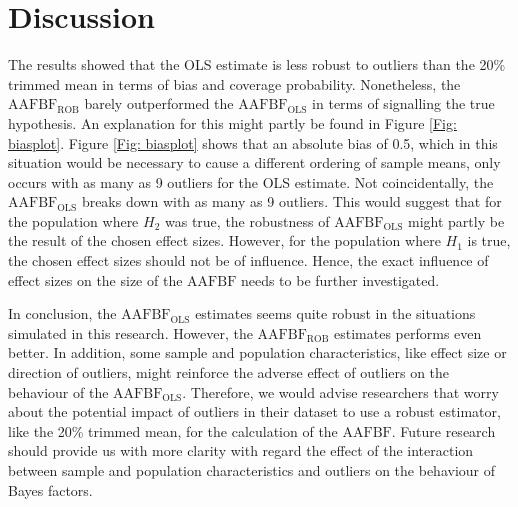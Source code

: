 \documentclass[11pt, a4paper]{article}
\begin{document}
\section{Discussion}
\label{section: Discussion}
The results showed that the OLS estimate is less robust to outliers than the 20\% trimmed mean in terms of bias and coverage probability. 
Nonetheless, the $\mathrm{AAFBF_{ROB}}$ barely outperformed the $\mathrm{AAFBF_{OLS}}$ in terms of signalling the true hypothesis. 
An explanation for this might partly be found in Figure \ref{Fig: biasplot}. 
Figure \ref{Fig: biasplot} shows that an absolute bias of 0.5, which in this situation would be necessary to cause a different ordering of sample means, only occurs with as many as 9 outliers for the OLS estimate. 
Not coincidentally, the $\mathrm{AAFBF_{OLS}}$ breaks down with as many as 9 outliers.  
This would suggest that for the population where $H_2$ was true, the robustness of  $\mathrm{AAFBF_{OLS}}$ might partly be the result of the chosen effect sizes. 
However, for the population where $H_1$ is true, the chosen effect sizes should not be of influence. 
Hence, the exact influence of effect sizes on the size of the $\mathrm{AAFBF}$ needs to be further investigated. 

In conclusion, the $\mathrm{AAFBF_{OLS}}$ estimates seems quite robust in the situations simulated in this research. 
However, the $\mathrm{AAFBF_{ROB}}$ estimates performs even better. In addition, some sample and population characteristics, like effect size or direction of outliers, might reinforce the adverse effect of outliers on the behaviour of the $\mathrm{AAFBF_{OLS}}$. 
Therefore, we would advise researchers that worry about the potential impact of outliers in their dataset to use a robust estimator, like the 20\% trimmed mean, for the calculation of the $\mathrm{AAFBF}$. 
Future research should provide us with more clarity with regard the effect of the interaction between sample and population characteristics and outliers on the behaviour of Bayes factors. 



\end{document}
